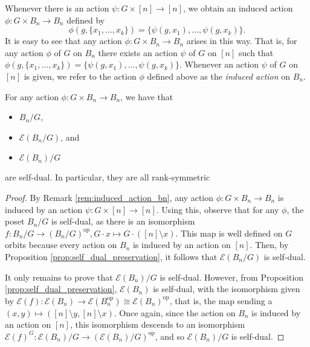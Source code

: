 \documentclass[smallextended, envcountsame, numbook]{svjour3}
\numberwithin{equation}{section}
\newcommand\op{\operatorname{op}}
\begin{document}
\begin{remark}
\label{rem:induced_action_bn}
Whenever there is an action $\psi\colon G \times [n] \rightarrow [n]$, we obtain an induced action $\phi: G \times B_n \rightarrow B_n$ defined by
$$\phi(g,\{x_1,\ldots, x_k\}) = \{\psi(g,x_1),\ldots, \psi(g,x_k)\}.$$
It is easy to see that any action $\phi\colon G \times B_n \rightarrow B_n$ arises in this way. That is, for any action $\phi$ of $G$ on $B_n$ there exists an action $\psi$ of $G$ on $[n]$ such that $\phi(g,\{x_1,\ldots, x_k\}) = \{\psi(g,x_1),\ldots, \psi(g,x_k)\}$. Whenever an action $\psi$ of $G$ on $[n]$ is given, we refer to the action $\phi$ defined above as the {\it induced action} on $B_n$.
\end{remark}


\begin{corollary}
\label{cor:duality_bn_quotients}
For any action $\phi\colon G \times B_n \rightarrow B_n$, we have that
\begin{itemize}
	\item $B_n/G$,
	\item $\mathcal E(B_n/G)$, and
	\item $\mathcal E(B_n)/G$
\end{itemize} are self-dual. In particular, they are all rank-symmetric 
\end{corollary}
\begin{proof}
By Remark \ref{rem:induced_action_bn}, any action $\phi\colon G\times B_n \rightarrow B_n$ is induced by an action $\psi\colon G \times [n] \rightarrow [n]$. Using this, observe that for any $\phi$, the poset $B_n/G$ is self-dual, as there is an isomorphism $f\colon B_n/G \rightarrow (B_n/G)^{\op},G \cdot x \mapsto G \cdot ([n] \setminus x)$. This map is well defined on $G$ orbits because every action on $B_n$ is induced by an action on $[n]$. Then, by Proposition \ref{prop:self_dual_preservation}, it follows that $\mathcal E(B_n/G)$ is self-dual.

It only remains to prove that $\mathcal E(B_n)/G$ is self-dual. However, from Proposition \ref{prop:self_dual_preservation}, $\mathcal E(B_n)$ is self-dual, with the isomorphism given by $\mathcal E(f)\colon\mathcal E(B_n) \rightarrow \mathcal E(B_n^{\op})\cong \mathcal E(B_n)^{\op}$, that is, the map sending a $(x,y) \mapsto ([n]\setminus y,[n] \setminus x)$. Once again, since the action on $B_n$ is induced by an action on $[n]$, this isomorphism descends to an isomorphism $\mathcal E(f)^G\colon\mathcal E(B_n)/G \rightarrow  (\mathcal{E}(B_n)/G)^{\op}$, and so $\mathcal E(B_n)/G$ is self-dual.
\end{proof}
\end{document}
